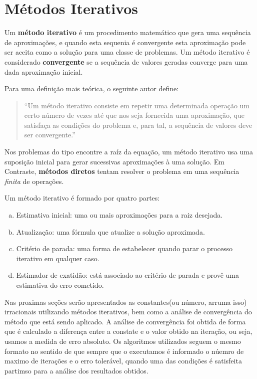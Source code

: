 \section{Métodos Iterativos}

	Um \textbf{método iterativo} é um procedimento matemático que gera uma
	sequência de aproximações, e quando esta sequenia é convergente esta
	aproximação pode ser aceita como a solução para uma classe de problemas. Um
	método iterativo é considerado \textbf{convergente} se a sequência de valores
	geradas converge para uma dada aproximação inicial.

	Para uma definição mais teórica, o seguinte autor define:

	\begin{quotation}

		``Um método iterativo consiste em repetir uma determinada operação um
		certo número de vezes até que nos seja fornecida uma aproximação, que
		satisfaça as condições do problema e, para tal, a sequência de valores
		deve ser convergente.''\cite{batista2014metodos}

	\end{quotation}

	Nos problemas do tipo encontre a raíz da equação, um método iterativo usa
	uma suposição inicial para gerar sucessivas aproximações à uma solução. Em
	Contraste, \textbf{métodos diretos} tentam resolver o problema em uma sequência
	\emph{finita} de operações.

	Um método iterativo é formado por quatro partes:~\cite{claudio2000calculo}

	\begin{enumerate}[a)]

		\item Estimativa inicial: uma ou mais aproximações para a raiz desejada.

		\item Atualização: uma fórmula que atualize a solução aproximada.

		\item Critério de parada: uma forma de estabelecer quando parar o processo iterativo em qualquer caso.

		\item Estimador de exatidão: está associado ao critério de parada e provê uma estimativa do erro cometido.

	\end{enumerate}

	Nas proximas seções serão apresentados as constantes(ou número, arruma
	isso) irracionais utilizando métodos iterativos, bem como a análise de
	convergência do método que está sendo aplicado. A análise de convergência
	foi obtida de forma que é calculado a diferença entre a constate e o valor
	obtido na iteração, ou seja, usamos a medida de erro absoluto. Os
	algoritmos utilizados seguem o mesmo formato no sentido de que sempre que o
	executamos é informado o núemro de maximo de iterações e o erro tolerável,
	quando uma das condições é satisfeita partimso para a análise dos
	resultados obtidos.

